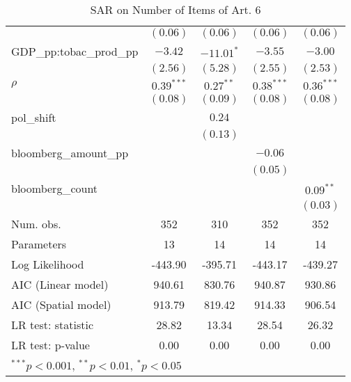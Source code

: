 \begin{table}[!h]
\begin{center}
\begin{tabular}{l c c c c }
                         & $(0.06)$     & $(0.06)$     & $(0.06)$     & $(0.06)$     \\
GDP\_pp:tobac\_prod\_pp  & $-3.42$      & $-11.01^{*}$ & $-3.55$      & $-3.00$      \\
                         & $(2.56)$     & $(5.28)$     & $(2.55)$     & $(2.53)$     \\
$\rho$                   & $0.39^{***}$ & $0.27^{**}$  & $0.38^{***}$ & $0.36^{***}$ \\
                         & $(0.08)$     & $(0.09)$     & $(0.08)$     & $(0.08)$     \\
pol\_shift               &              & $0.24$       &              &              \\
                         &              & $(0.13)$     &              &              \\
bloomberg\_amount\_pp    &              &              & $-0.06$      &              \\
                         &              &              & $(0.05)$     &              \\
bloomberg\_count         &              &              &              & $0.09^{**}$  \\
                         &              &              &              & $(0.03)$     \\
\midrule
Num. obs.                & 352          & 310          & 352          & 352          \\
Parameters               & 13           & 14           & 14           & 14           \\
Log Likelihood           & -443.90      & -395.71      & -443.17      & -439.27      \\
AIC (Linear model)       & 940.61       & 830.76       & 940.87       & 930.86       \\
AIC (Spatial model)      & 913.79       & 819.42       & 914.33       & 906.54       \\
LR test: statistic       & 28.82        & 13.34        & 28.54        & 26.32        \\
LR test: p-value         & 0.00         & 0.00         & 0.00         & 0.00         \\
\bottomrule
\multicolumn{5}{l}{\scriptsize{$^{***}p<0.001$, $^{**}p<0.01$, $^*p<0.05$}}
\end{tabular}
\caption{SAR on Number of Items of Art. 6}
\label{table:coefficients}
\end{center}
\end{table}
